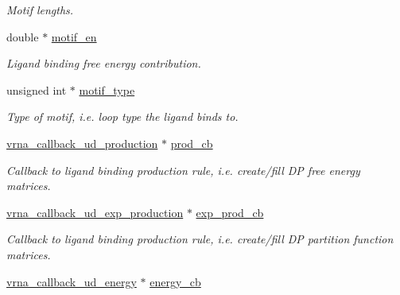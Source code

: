 \begin{DoxyCompactItemize}
\begin{DoxyCompactList}\small\item\em Motif lengths. \end{DoxyCompactList}\item 
double $\ast$ \hyperlink{group__domains__up_aae4f0a45419784fb7c244bce2781403d}{motif\+\_\+en}\hypertarget{group__domains__up_aae4f0a45419784fb7c244bce2781403d}{}\label{group__domains__up_aae4f0a45419784fb7c244bce2781403d}

\begin{DoxyCompactList}\small\item\em Ligand binding free energy contribution. \end{DoxyCompactList}\item 
unsigned int $\ast$ \hyperlink{group__domains__up_a3f0c026cced369ff176a66b2820f2057}{motif\+\_\+type}\hypertarget{group__domains__up_a3f0c026cced369ff176a66b2820f2057}{}\label{group__domains__up_a3f0c026cced369ff176a66b2820f2057}

\begin{DoxyCompactList}\small\item\em Type of motif, i.\+e. loop type the ligand binds to. \end{DoxyCompactList}\item 
\hyperlink{group__domains__up_ga5cb14c4f2149c3df9842a709d6d64140}{vrna\+\_\+callback\+\_\+ud\+\_\+production} $\ast$ \hyperlink{group__domains__up_ac2656d57130ac56e85212836482cbe80}{prod\+\_\+cb}
\begin{DoxyCompactList}\small\item\em Callback to ligand binding production rule, i.\+e. create/fill DP free energy matrices. \end{DoxyCompactList}\item 
\hyperlink{group__domains__up_gae4c18aa60c657a4a856a4b41a9fbc0dc}{vrna\+\_\+callback\+\_\+ud\+\_\+exp\+\_\+production} $\ast$ \hyperlink{group__domains__up_a181ae6ec67f77e68899ec6a0780f3e01}{exp\+\_\+prod\+\_\+cb}\hypertarget{group__domains__up_a181ae6ec67f77e68899ec6a0780f3e01}{}\label{group__domains__up_a181ae6ec67f77e68899ec6a0780f3e01}

\begin{DoxyCompactList}\small\item\em Callback to ligand binding production rule, i.\+e. create/fill DP partition function matrices. \end{DoxyCompactList}\item 
\hyperlink{group__domains__up_ga60a2244cf1415fd076cc0dba92c2a96d}{vrna\+\_\+callback\+\_\+ud\+\_\+energy} $\ast$ \hyperlink{group__domains__up_a1efba765dd4ea893dc8bd7362761f99b}{energy\+\_\+cb}\hypertarget{group__domains__up_a1efba765dd4ea893dc8bd7362761f99b}{}\label{group__domains__up_a1efba765dd4ea893dc8bd7362761f99b}


\end{DoxyCompactItemize}
